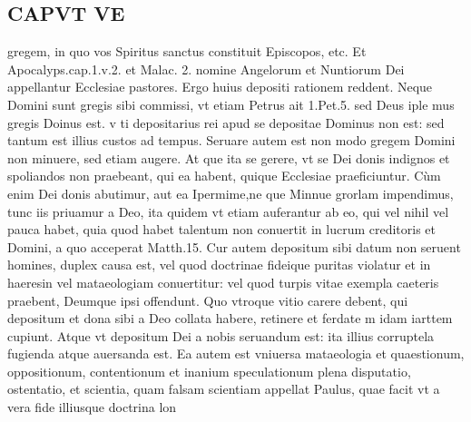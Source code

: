 \documentclass{article}
\begin{document}
\begin{pages}
\section*{CAPVT VE }
\marginpar{[ p.509 ]}\pstart gregem, in quo vos Spiritus sanctus constituit Episcopos, etc. Et Apocalyps.cap.1.v.2. et Malac. 2. nomine Angelorum et Nuntiorum Dei appellantur Ecclesiae pastores. Ergo huius depositi rationem reddent. Neque Domini sunt gregis sibi commissi, vt etiam Petrus ait 1.Pet.5. sed Deus iple mus gregis Doinus est. v ti depositarius rei apud se depositae Dominus non est: sed tantum est illius custos ad tempus.  \pend\pstart Seruare autem est non modo gregem Domini non minuere, sed etiam augere. At que ita se gerere, vt se Dei donis indignos et spoliandos non praebeant, qui ea habent, quique Ecclesiae praeficiuntur. Cùm enim Dei donis abutimur, aut ea Ipermime,ne que Minnue grorlam impendimus, tunc iis priuamur a Deo, ita quidem vt etiam auferantur ab eo, qui vel nihil vel pauca habet, quia quod habet talentum non conuertit in lucrum creditoris et Domini, a quo acceperat Matth.15.  \pend\pstart Cur autem depositum sibi datum non seruent homines, duplex causa est, vel quod doctrinae fideique puritas violatur et in haeresin vel mataeologiam conuertitur: vel quod turpis vitae exempla caeteris praebent, Deumque ipsi offendunt. Quo vtroque vitio carere debent, qui depositum et dona sibi a Deo collata habere, retinere et ferdate m idam iarttem cupiunt.  \pend\pstart Atque vt depositum Dei a nobis seruandum est: ita illius corruptela fugienda atque auersanda est. Ea autem est vniuersa mataeologia et quaestionum, oppositionum, contentionum et inanium speculationum plena disputatio, ostentatio, et scientia, quam falsam scientiam appellat Paulus, quae facit vt a vera fide illiusque doctrina lon\pend

\end{pages}
\end{document}
